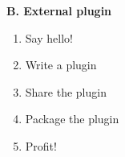\documentclass[20pt]{beamer}
\newcommand\tx[2]{\alt<#1>{\textcolor{ta3gray}}{\textcolor{ta3gray}}{\uncover<#1->{#2}}}
\newcommand\rd[2]{\alt<#1>{\textcolor{tagray}}{\textcolor{ta3gray}}{#2}}
\begin{document}
\begin{center}
\begin{frame}[fragile]
    \textbf{B. External plugin}
    \bigskip\bigskip

    \begin{enumerate}
    \item Say hello!
    \item Write a plugin
    \item Share the plugin
    \item Package the plugin
    \item Profit!
    \end{enumerate}
\end{frame}

% 
%    
% 
\end{center}
\end{document}
